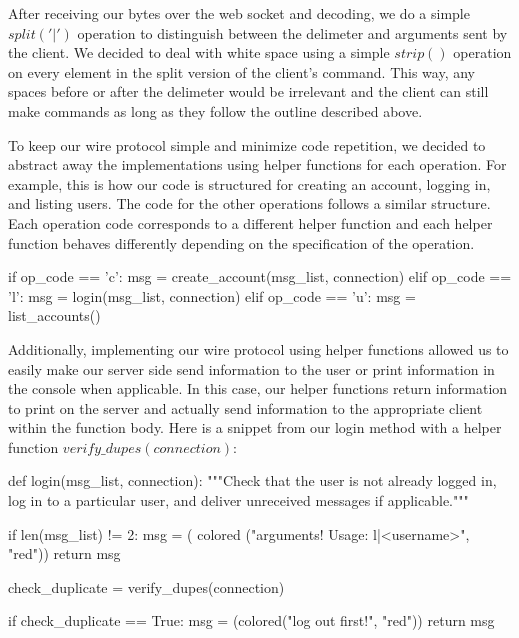 \documentclass[
	a4paper, %
	10pt, %
	unnumberedsections, %
	twoside, %
]{LTJournalArticle}
\begin{document}
After receiving our bytes over the web socket and decoding, we do a simple 
$split('|')$ operation to distinguish between the delimeter and arguments sent by the client. We decided to deal with white space using a simple $strip()$ operation on every element in the split version of the client's command. This way, any spaces before or after the delimeter would be irrelevant and the client can still make commands as long as they follow the outline described above. 

To keep our wire protocol simple and minimize code repetition, we decided to abstract away the implementations using helper functions for each operation. For example, this is how our code is structured for creating an account, logging in, and listing users. The code for the other operations follows a similar structure. Each operation code corresponds to a different helper function and each helper function behaves differently depending on the specification of the operation.

\begin{python}
    if op_code == 'c': 
        msg = create_account(msg_list, 
        connection)
    elif op_code == 'l':
        msg = login(msg_list, connection)
    elif op_code == 'u':
        msg = list_accounts()
\end{python}

Additionally, implementing our wire protocol using helper functions allowed us to easily make our server side send information to the user or print information in the console when applicable. In this case, our helper functions return information to print on the server and actually send information to the appropriate client within the function body. Here is a snippet from our login method with a helper function $verify\_dupes(connection)$: 

\begin{python}
    def login(msg_list, connection):
        """Check that the user is not already 
        logged in, log in to a particular 
        user, and deliver unreceived messages 
        if applicable."""

        if len(msg_list) != 2:
            msg = (
            colored
            ("\nInvalid arguments! 
            Usage: l|<username>\n", 
            "red"))
            return msg

        check_duplicate = 
        verify_dupes(connection)

        if check_duplicate == True:
            msg = (colored("\nPlease log out 
            first!\n", 
            "red"))
            return msg
\end{python}
\end{document}
